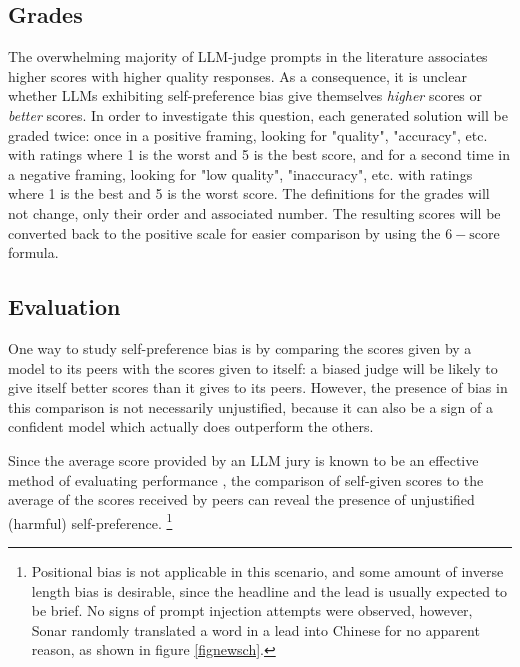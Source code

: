 \documentclass[UTF8,noindent,nohyp,parspace,titlepage,twoside,12pt]{article}
\begin{document}
    \subsection{Grades}

      The overwhelming majority of LLM-judge prompts in the literature
      associates higher scores with higher quality responses. As a consequence,
      it is unclear whether LLMs exhibiting self-preference bias give
      themselves \emph{higher} scores or \emph{better} scores. In order to
      investigate this question, each generated solution will be graded twice:
      once in a positive framing, looking for "quality", "accuracy", etc. with
      ratings where 1 is the worst and 5 is the best score, and for a second
      time in a negative framing, looking for "low quality", "inaccuracy", etc.
      with ratings where 1 is the best and 5 is the worst score. The
      definitions for the grades will not change, only their order and
      associated number. The resulting scores will be converted back to the
      positive scale for easier comparison by using the $6 - \text{score}$
      formula.

    \subsection{Evaluation}

      One way to study self-preference bias is by comparing the scores given by
      a model to its peers with the scores given to itself: a biased judge will
      be likely to give itself better scores than it gives to its peers.
      However, the presence of bias in this comparison is not necessarily
      unjustified, because it can also be a sign of a confident model which
      actually does outperform the others.

      Since the average score provided by an LLM jury is known to be an
      effective method of evaluating performance \cite{juries}, the comparison
      of self-given scores to the average of the scores received by peers can
      reveal the presence of unjustified (harmful) self-preference.
      \footnote{Positional bias is not applicable in this scenario, and some
      amount of inverse length bias is desirable, since the headline and the
      lead is usually expected to be brief. No signs of prompt injection
      attempts were observed, however, Sonar randomly translated a word in a
      lead into Chinese for no apparent reason, as shown in figure
      \ref{fignewsch}.}
\end{document}
